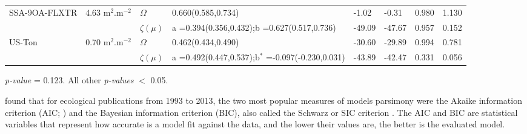 \documentclass[a4paper,11pt]{report}
\begin{document}
\begin{sidewaystable}
\begin{tabular}{p{4.0cm} p{2.1cm} p{1.5cm} p{4.1cm} p{2.1cm} p{2.1cm} p{2.1cm} p{2.1cm}}
\hline
\multirow{1}{*}{SSA-9OA-FLXTR} 
    & 4.63 m$^2$.m$^{-2}$ &  \bf $\Omega$         &  0.660(0.585,0.734) & -1.02 & -0.31 & 0.980 & 1.130\\
    &  &  \bf $\zeta(\mu)$         &  a =0.394(0.356,0.432);\newline b =0.627(0.517,0.736) & -49.09	& -47.67 & 0.957 & 0.152\\
\hline
\multirow{1}{*}{US-Ton} 
    & 0.70 m$^2$.m$^{-2}$ &  \bf $\Omega$         &  0.462(0.434,0.490) & -30.60 & -29.89 & 0.994 & 0.781\\
    &  &  \bf $\zeta(\mu)$         &  a =0.492(0.447,0.537);\newline b$^*$ =-0.097(-0.230,0.031)& -43.89	& -42.47 & 0.331 & 0.056\\
\hline
\hline
 \end{tabular}
\label{tab:sites_stats}
\begin{tablenotes}
      \small
      \item *\textit{p-value} = 0.123. All other \textit{p-values} $<$ 0.05.
\end{tablenotes}
\end{sidewaystable}
\newpage

\citet{Aho2014} found that for ecological publications from 1993 to 2013, the two most popular measures of model\textsinglequote s parsimony were the Akaike information criterion (AIC; \citet{Akaike1973}) and the Bayesian information criterion (BIC), also called the Schwarz or SIC criterion \citep{Schwarz1978}. The AIC and BIC are statistical variables that represent how accurate is a model fit against the data, and the lower their values are, the better is the evaluated model. 
\end{document}
